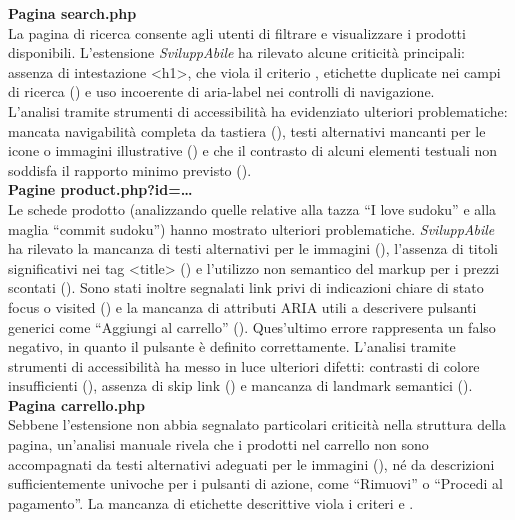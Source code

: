 \noindent \textbf{Pagina search.php}\\
La pagina di ricerca consente agli utenti di filtrare e visualizzare i prodotti disponibili. 
L’estensione \textit{SviluppAbile} ha rilevato alcune criticità principali: assenza di intestazione <h1>, che viola il criterio {}, etichette duplicate nei campi di ricerca ({}) e uso incoerente di aria-label nei controlli di navigazione.\\
L’analisi tramite strumenti di accessibilità ha evidenziato ulteriori problematiche: mancata navigabilità completa da tastiera ({}), testi alternativi mancanti per le icone o immagini illustrative ({}) e che il contrasto di alcuni elementi testuali non soddisfa il rapporto minimo previsto ({}).\\

\noindent \textbf{Pagine product.php?id=…}\\
Le schede prodotto (analizzando quelle relative alla tazza “I love sudoku” e alla maglia “commit sudoku”) hanno mostrato ulteriori problematiche. \textit{SviluppAbile} ha rilevato la mancanza di testi alternativi per le immagini ({}), l’assenza di titoli significativi nei tag <title> ({}) e l’utilizzo non semantico del markup per i prezzi scontati ({}). Sono stati inoltre segnalati link privi di indicazioni chiare di stato focus o visited ({}) e la mancanza di attributi ARIA utili a descrivere pulsanti generici come “Aggiungi al carrello” ({}). Ques'ultimo errore rappresenta un falso negativo, in quanto il pulsante è definito correttamente.
L’analisi tramite strumenti di accessibilità ha messo in luce ulteriori difetti: contrasti di colore insufficienti ({}), assenza di skip link ({}) e mancanza di landmark semantici ({}).\\

\noindent \textbf{Pagina carrello.php}\\
Sebbene l’estensione non abbia segnalato particolari criticità nella struttura della pagina, un’analisi manuale rivela che i prodotti nel carrello non sono accompagnati da testi alternativi adeguati per le immagini ({}), né da descrizioni sufficientemente univoche per i pulsanti di azione, come “Rimuovi” o “Procedi al pagamento”. La mancanza di etichette descrittive viola i criteri {} e {}.\\

